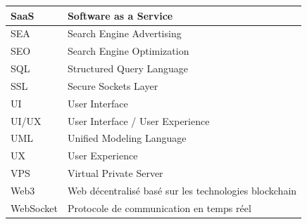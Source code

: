 \begin{longtable}{|p{3cm}|p{11cm}|}
SaaS      & Software as a Service \\ \hline
SEA       & Search Engine Advertising \\ \hline
SEO       & Search Engine Optimization \\ \hline
SQL       & Structured Query Language \\ \hline
SSL       & Secure Sockets Layer \\ \hline
UI        & User Interface \\ \hline
UI/UX     & User Interface / User Experience \\ \hline
UML       & Unified Modeling Language \\ \hline
UX        & User Experience \\ \hline
VPS       & Virtual Private Server \\ \hline
Web3      & Web décentralisé basé sur les technologies blockchain \\ \hline
WebSocket & Protocole de communication en temps réel \\ \hline
\end{longtable}